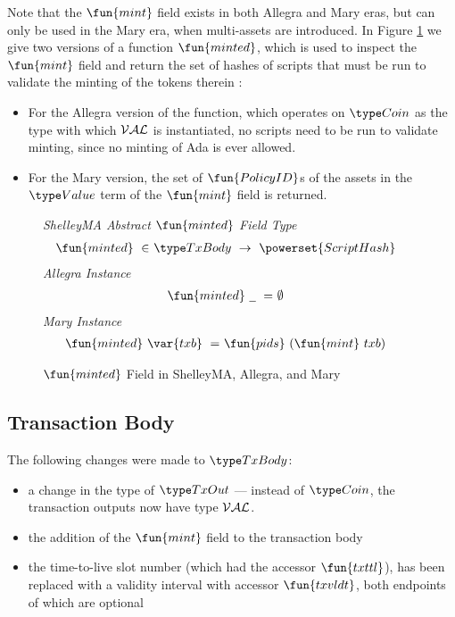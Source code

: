 Note that the $\fun{mint}$ field exists in both Allegra and Mary eras,
but can only be used in the Mary era, when multi-assets are introduced.
In Figure \ref{fig:minted} we give two versions of a function $\fun{minted}$,
which is used to inspect the $\fun{mint}$ field and return the set of hashes
of scripts that must be run to validate the minting of the tokens therein :

\begin{itemize}
  \item For the Allegra version of the function, which operates on $\Coin$ as the
  type with which $\mathcal{VAL}$ is instantiated, no scripts need to be run
  to validate minting, since no minting of Ada is ever allowed.

  \item For the Mary version, the set of $\fun{PolicyID}$s of the
  assets in the $\Value$ term of the $\fun{mint}$ field is returned.
\end{itemize}

\begin{figure*}[t!]
  \emph{ShelleyMA Abstract $\fun{minted}$ Field Type}
  \begin{align*}
    \fun{minted}~\in&~ \TxBody~\to~\powerset{ScriptHash}
  \end{align*}
  \emph{Allegra Instance}
  \begin{align*}
    \fun{minted}~\wcard~=&~ \emptyset
  \end{align*}
  \emph{Mary Instance}
  \begin{align*}
    \fun{minted}~\var{txb}~=&~ \fun{pids}~(\fun{mint}~{txb})
  \end{align*}
  \caption{$\fun{minted}$ Field in ShelleyMA, Allegra, and Mary}
  \label{fig:minted}
\end{figure*}

\subsection*{Transaction Body}

The following changes were made to $\TxBody$:

\begin{itemize}
  \item a change in the type of $\TxOut$ --- instead of
$\Coin$, the transaction outputs now have type $\mathcal{VAL}$.
  \item the addition of the $\fun{mint}$ field to the transaction body
  \item the time-to-live slot number (which had the accessor $\fun{txttl}$),
  has been replaced with a validity interval with accessor $\fun{txvldt}$,
  both endpoints of which are optional
\end{itemize}


